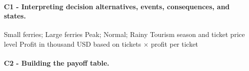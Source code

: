 \paragraph*{C1 - Interpreting decision alternatives, events, consequences, and states.}
	\label{subsec:problem9-lake-ferry-tourism-c1}
	\DecisionElementsTable
	{Small ferries; Large ferries}
	{Peak; Normal; Rainy}
	{Tourism season and ticket price level}
	{Profit in thousand USD based on tickets $\times$ profit per ticket}


	\par\noindent\begin{minipage}{\linewidth}
\paragraph*{C2 - Building the payoff table.}
	\label{subsec:problem9-lake-ferry-tourism-c2}
\leavevmode\par


\end{minipage}
